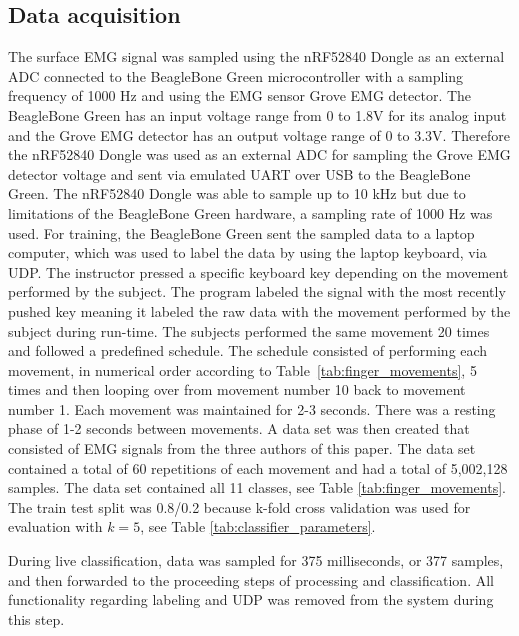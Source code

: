 \subsection{Data acquisition}
The surface EMG signal was sampled using the nRF52840 Dongle as an external ADC connected to the BeagleBone Green microcontroller with a sampling frequency of 1000 Hz and using the EMG sensor Grove EMG detector. The BeagleBone Green has an input voltage range from 0 to 1.8V for its analog input and the Grove EMG detector has an output voltage range of 0 to 3.3V. Therefore the nRF52840 Dongle was used as an external ADC for sampling the Grove EMG detector voltage and sent via emulated UART over USB to the BeagleBone Green. The nRF52840 Dongle was able to sample up to 10 kHz but due to limitations of the BeagleBone Green hardware, a sampling rate of 1000 Hz was used. For training, the BeagleBone Green sent the sampled data to a laptop computer, which was used to label the data by using the laptop keyboard, via UDP. The instructor pressed a specific keyboard key depending on the movement performed by the subject. The program labeled the signal with the most recently pushed key meaning it labeled the raw data with the movement performed by the subject during run-time. The subjects performed the same movement 20 times and followed a predefined schedule. The schedule consisted of performing each movement, in numerical order according to Table~\ref{tab:finger_movements}, 5 times and then looping over from movement number 10 back to movement number 1. Each movement was maintained for 2-3 seconds. There was a resting phase of 1-2 seconds between movements. A data set was then created that consisted of EMG signals from the three authors of this paper. The data set contained a total of 60 repetitions of each movement and had a total of 5,002,128 samples. The data set contained all 11 classes, see Table \ref{tab:finger_movements}. The train test split was 0.8/0.2 because k-fold cross validation was used for evaluation with $k=5$, see Table \ref{tab:classifier_parameters}.

During live classification, data was sampled for 375 milliseconds, or 377 samples, and then forwarded to the proceeding steps of processing and classification. All functionality regarding labeling and UDP was removed from the system during this step.



